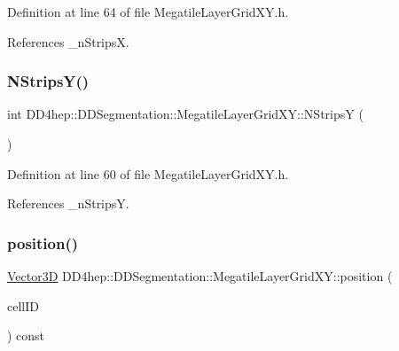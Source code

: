 Definition at line 64 of file Megatile\+Layer\+Grid\+X\+Y.\+h.



References \+\_\+n\+StripsX.

\hypertarget{class_d_d4hep_1_1_d_d_segmentation_1_1_megatile_layer_grid_x_y_a66306093675275c371f813c48fb39d70}{}\label{class_d_d4hep_1_1_d_d_segmentation_1_1_megatile_layer_grid_x_y_a66306093675275c371f813c48fb39d70} 
\subsubsection{\texorpdfstring{N\+Strips\+Y()}{NStripsY()}}
{\footnotesize\ttfamily int D\+D4hep\+::\+D\+D\+Segmentation\+::\+Megatile\+Layer\+Grid\+X\+Y\+::\+N\+StripsY (\begin{DoxyParamCaption}{ }\end{DoxyParamCaption})\hspace{0.3cm}{\ttfamily [inline]}}



Definition at line 60 of file Megatile\+Layer\+Grid\+X\+Y.\+h.



References \+\_\+n\+StripsY.

\hypertarget{class_d_d4hep_1_1_d_d_segmentation_1_1_megatile_layer_grid_x_y_a7ec0272831c54892acf762c97a857083}{}\label{class_d_d4hep_1_1_d_d_segmentation_1_1_megatile_layer_grid_x_y_a7ec0272831c54892acf762c97a857083} 
\subsubsection{\texorpdfstring{position()}{position()}}
{\footnotesize\ttfamily \hyperlink{struct_d_d4hep_1_1_d_d_segmentation_1_1_vector3_d}{Vector3D} D\+D4hep\+::\+D\+D\+Segmentation\+::\+Megatile\+Layer\+Grid\+X\+Y\+::position (\begin{DoxyParamCaption}\item[{const \hyperlink{namespace_d_d4hep_1_1_d_d_segmentation_ac7af071d85cb48820914434a07e21ba1}{Cell\+ID} \&}]{cell\+ID }\end{DoxyParamCaption}) const\hspace{0.3cm}{\ttfamily [virtual]}}



